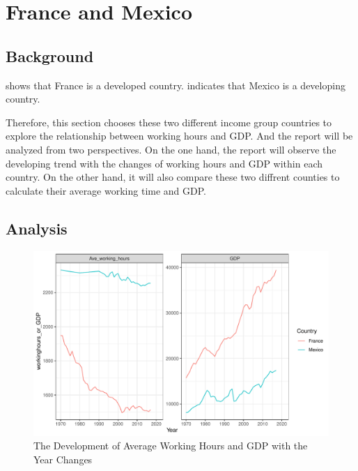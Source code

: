 \documentclass[11pt,a4paper,]{article}
\begin{document}
\clearpage

\hypertarget{france-and-mexico}{%
\section{France and Mexico}\label{france-and-mexico}}

\hypertarget{background-1}{%
\subsection{Background}\label{background-1}}

\textcite{reference1} shows that France is a developed country. \textcite{reference2} indicates that Mexico is a developing country.

Therefore, this section chooses these two different income group countries to explore the relationship between working hours and GDP. And the report will be analyzed from two perspectives. On the one hand, the report will observe the developing trend with the changes of working hours and GDP within each country. On the other hand, it will also compare these two diffrent counties to calculate their average working time and GDP.

\hypertarget{analysis}{%
\subsection{Analysis}\label{analysis}}

\begin{figure}

{\centering \includegraphics{report_files/figure-latex/timechanges-1} 

}

\caption{The Development of Average Working Hours and GDP with the Year Changes}\label{fig:timechanges}
\end{figure}
\end{document}
